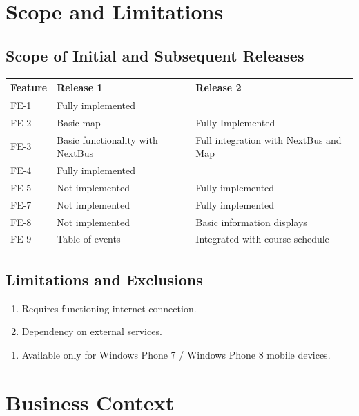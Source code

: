 \documentclass[pdftex,12pt,letter]{article}
\begin{document}
\section{Scope and Limitations}
\subsection{Scope of Initial and Subsequent Releases}
\begin{table}[!h]
\begin{tabularx}{\textwidth }[t]{|l|Y|Y|}
\hline
\bfseries Feature & \bfseries\hspace{1cm}Release 1 & \bfseries\hspace{1cm}Release 2\\ \hline
FE-1 & Fully implemented & ~\\ \hline
FE-2 & Basic map & Fully Implemented\\ \hline
FE-3 & Basic functionality with NextBus & Full integration with NextBus and Map\\ \hline
FE-4 & Fully implemented & ~ \\ \hline
FE-5 & Not implemented & Fully implemented\\ \hline
FE-7 & Not implemented & Fully implemented\\ \hline
FE-8 & Not implemented & Basic information displays\\ \hline
FE-9 & Table of events & Integrated with course schedule \\ \hline
\end{tabularx}
\end{table}
\FloatBarrier
\subsection{Limitations and Exclusions}
\begin{enumerate}[L{I}-1:]
\item Requires functioning internet connection.
\item Dependency on external services.
\end{enumerate}
\begin{enumerate}[EX-1:]
\item Available only for Windows Phone 7 / Windows Phone 8 mobile devices.
\end{enumerate}
\section{Business Context}
\end{document}
